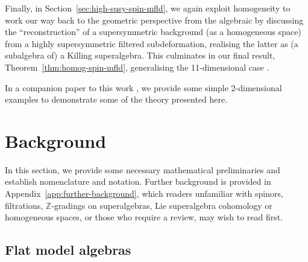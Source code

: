 \documentclass[pdftex]{sigma}
\numberwithin{equation}{section}
\newcommand{\ZZ}{\mathbb{Z}}
\newcommand{\1}{\mathbbm{1}}
\begin{document}
Finally, in Section~\ref{sec:high-susy-spin-mfld}, we again exploit homogeneity to work our way back to the geometric perspective from the algebraic by discussing the ``reconstruction'' of a supersymmetric background (as a homogeneous space) from a highly supersymmetric filtered subdeformation, realising the latter as (a subalgebra of) a Killing superalgebra. This culminates in our final result, Theorem~\ref{thm:homog-spin-mfld}, generalising the 11-dimensional case \cite[Theorem~13]{Figueroa-OFarrill2017_1}.

In a companion paper to this work \cite{Beckett2024_3}, we provide some simple 2-dimensional examples to demonstrate some of the theory presented here.

\section{Background}
\label{sec:background}

In this section, we provide some necessary mathematical preliminaries and establish nomenclature and notation. Further background is provided in Appendix~\ref{app:further-background}, which readers unfamiliar with spinors, filtrations, $\ZZ$-gradings on superalgebras, Lie superalgebra cohomology or homogeneous spaces, or those who require a review, may wish to read first.

\subsection{Flat model algebras}
\label{sec:flat-model-algs}
\end{document}
